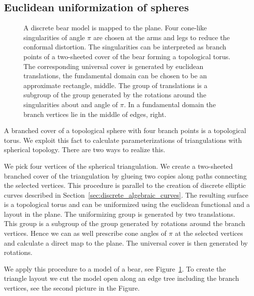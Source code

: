 \documentclass[Thesis.tex]{subfiles}
\begin{document}
  \subsection{Euclidean uniformization of spheres}

  \begin{figure}
      \centering
  \caption{
  A discrete bear model is mapped to the plane.
  Four cone-like singularities of angle $\pi$ are chosen at the arms and legs to reduce the conformal distortion.
  The singularities can be interpreted as branch points of a two-sheeted cover of the bear forming a topological torus.
  The corresponding universal cover is generated by euclidean translations, the fundamental domain can be chosen to be an approximate rectangle, middle.
  The group of translations is a subgroup of the group generated by the rotations around the singularities about and angle of $\pi$. In a fundamental domain the branch vertices lie in the middle of edges, right.
  }
  \label{fig:bear}
  \end{figure}

  A branched cover of a topological sphere with four branch points is a topological torus.
  We exploit this fact to calculate parameterizations of triangulations with spherical topology.
  There are two ways to realize this.

  We pick four vertices of the spherical triangulation. We create a two-sheeted branched cover of the triangulation by glueing two copies along paths connecting the selected vertices.
  This procedure is parallel to the creation of discrete elliptic curves described in Section~\ref{sec:discrete_algebraic_curves}.
  The resulting surface is a topological torus and can be uniformized using the euclidean functional and a layout in the plane.
  The uniformizing group is generated by two translations.
  This group is a subgroup of the group generated by rotations around the branch vertices.
  Hence we can as well prescribe cone angles of $\pi$ at the selected vertices and calculate a direct map to the plane.
  The universal cover is then generated by rotations.

  We apply this procedure to a model of a bear, see Figure~\ref{fig:bear}. To create the triangle layout we cut the model open along an edge tree including the branch vertices, see the second picture in the Figure.
\end{document}
